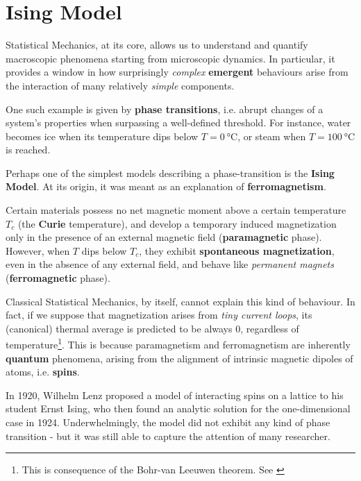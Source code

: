 \documentclass[../../main.tex]{subfiles}
\begin{document}
\chapter{Ising Model}

Statistical Mechanics, at its core, allows us to understand and quantify macroscopic phenomena starting from microscopic dynamics. In particular, it provides a window in how surprisingly \textit{complex} \textbf{emergent} behaviours arise from the interaction of many relatively \textit{simple}  components.

\medskip

One such example is given by \textbf{phase transitions}, i.e. abrupt changes of a system's properties when surpassing a well-defined threshold. For instance, water becomes ice when its temperature dips below $T=\SI{0}{\celsius}$, or steam when $T = \SI{100}{\celsius}$ is reached.

\medskip

Perhaps one of the simplest models describing a phase-transition is the \textbf{Ising Model}. At its origin, it was meant as an explanation of \textbf{ferromagnetism}. 

Certain materials possess no net magnetic moment above a certain temperature $T_c$ (the \textbf{Curie} temperature), and develop a temporary induced magnetization only in the presence of an external magnetic field (\textbf{paramagnetic} phase). However, when $T$ dips below $T_c$, they exhibit \textbf{spontaneous magnetization}, even in the absence of any external field, and behave like \textit{permanent magnets} (\textbf{ferromagnetic} phase).

\medskip

Classical Statistical Mechanics, by itself, cannot explain this kind of behaviour. In fact, if we suppose that magnetization arises from \textit{tiny current loops}, its (canonical) thermal average is predicted to be always $0$, regardless of temperature\footnote{This is consequence of the Bohr-van Leeuwen theorem. See \cite{ferromagnets}}. 
This is because paramagnetism and ferromagnetism are inherently \textbf{quantum} phenomena, arising from the alignment of intrinsic magnetic dipoles of atoms, i.e. \textbf{spins}.

\medskip

In 1920, Wilhelm Lenz proposed a model of interacting spins on a lattice to his student Ernst Ising, who then found an analytic solution for the one-dimensional case in 1924. Underwhelmingly, the model did not exhibit any kind of phase transition - but it was still able to capture the attention of many researcher.
\end{document}
